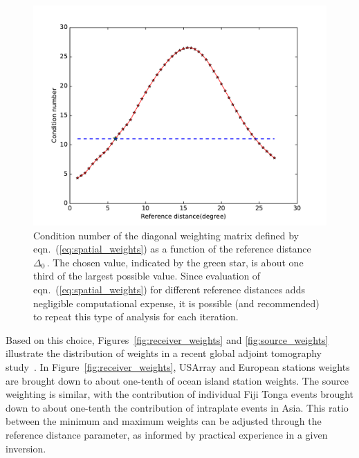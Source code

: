 \begin{figure}
    \centering 
 	\includegraphics[width=.95\textwidth]{ch-weighting/figures/source_weight_cond_num.pdf}
\caption{\small{Condition number of the diagonal weighting matrix defined by eqn.~(\ref{eq:spatial_weights})
as a function of the reference distance~$\Delta_0$\,.
The chosen value, indicated by the green star, is about one third of the largest possible value.
Since evaluation of eqn.~(\ref{eq:spatial_weights}) for different reference distances adds negligible computational expense, it is possible (and recommended) to repeat this type of analysis for each iteration.
}}
\label{fig:weight_condnum}
\end{figure}

Based on this choice, Figures~\ref{fig:receiver_weights} and \ref{fig:source_weights} illustrate the
distribution of weights in a recent global adjoint tomography study~\cite{Lei2018}. In Figure~\ref{fig:receiver_weights},
USArray and European stations weights are brought down to about one-tenth of ocean island station weights. The source weighting is similar, with the contribution of individual Fiji Tonga events brought down to about one-tenth the contribution of intraplate events in Asia. This ratio between the minimum and maximum weights can be adjusted through the reference distance parameter, as informed by practical experience in a given inversion.

